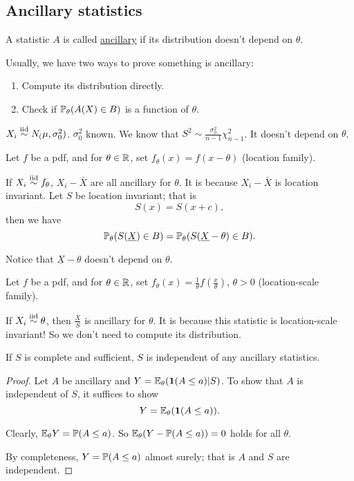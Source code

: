 \subsection{Ancillary statistics}
\begin{mydef}
	A statistic $A$ is called \underline{ancillary} if its distribution doesn't depend on $\theta$.
\end{mydef}
\begin{remark}
	Usually, we have two ways to prove something is ancillary: 
	\begin{enumerate}
		\item Compute its distribution directly. 
		\item Check if $\mathbb{P}_\theta(A(X)\in B )$ is a function of $\theta$.
	\end{enumerate} 
\end{remark}

\begin{exap}
	$X_i \stackrel{\text{iid}}{\sim} N_(\mu, \sigma^2_0)$. $\sigma^2_0$ known. We know that $S^2 \sim \frac{\sigma^2_0}{n-1} \chi^2_{n-1}$. It doesn't depend on $\theta$.
\end{exap}

\begin{exap}
	Let $f$ be a pdf, and for $\theta \in \mathbb{R}$, set $f_\theta(x) = f(x-\theta)$ (location family). 
	
	If $X_i \stackrel{\text{iid}}{\sim} f_\theta$, $X_i - \bar{X}$ are all ancillary for $\theta$. It is because $X_i - \bar{X}$ is location invariant. Let $S$ be location invariant; that is $$S(x) = S(x + c),$$
	then we have
	$$\mathbb{P}_\theta ( S(\underline{X}) \in B ) = \mathbb{P}_\theta ( S(\underline{X} - \theta) \in B ).$$
	
	Notice that $\underline{X} - \theta$ doesn't depend on $\theta$.
\end{exap} 

\begin{exap}
	Let $f$ be a pdf, and for $\theta \in \mathbb{R}$, set $f_\theta(x) = \frac{1}{\theta}f(\frac{x}{\theta})$, $\theta>0$ (location-scale family). 
	
	If $X_i \stackrel{\text{iid}}{\sim} \theta$, then $\frac{\bar{X}}{S}$ is ancillary for $\theta$. It is because this statistic is location-scale invariant! So we don't need to compute its distribution.
\end{exap}

{\color{blue}\begin{thm}[Basu]
		If $S$ is complete and sufficient, $S$ is independent of any ancillary statistics.
		\end{thm}
		}
\begin{proof}
	Let $A$ be ancillary and $Y = \mathbb{E}_\theta ( \boldsymbol{1}(A \leq a) | S )$. To show that $A$ is independent of $S$, it suffices to show 
	$$Y = \mathbb{E}_\theta(\boldsymbol{1}(A \leq a) ).$$
	
	Clearly, $\mathbb{E}_\theta Y = \mathbb{P}(A \leq a)$. So $\mathbb{E}_\theta (Y - \mathbb{P}(A \leq a)) = 0$ holds for all $\theta$.
	
	By completeness, $Y = \mathbb{P}(A \leq a)$ almost surely; that is $A$ and $S$ are independent.
\end{proof}

